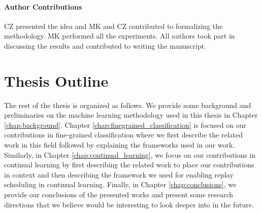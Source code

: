 \paragraph{Author Contributions} 
CZ presented the idea and MK and CZ contributed to formalizing the methodology. 
MK performed all the experiments. 
All authors took part in discussing the results and contributed to writing the manuscript. 



\section{Thesis Outline}\label{sec:outline}
The rest of the thesis is organized as follows. We provide some background and preliminaries on the machine learning methodology used in this thesis in Chapter \ref{chap:background}. Chapter \ref{chap:finegrained_classification} is focused on our contributions in fine-grained classification where we first describe the related work in this field followed by explaining the frameworks used in our work. Similarly, in Chapter \ref{chap:continual_learning}, we focus on our contributions in continual learning by first describing the related work to place our contributions in context and then describing the framework we used for enabling replay scheduling in continual learning. Finally, in Chapter \ref{chap:conclusions}, we provide our conclusions of the presented works and present some research directions that we believe would be interesting to look deeper into in the future. 
